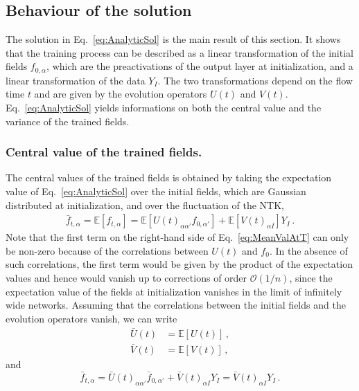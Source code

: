 \subsection{Behaviour of the solution}
\label{sec:BehaviourOfSolution}
The solution in Eq.~\eqref{eq:AnalyticSol} is the main result of this section. It shows that the
training process can be described as a linear transformation of the initial fields $f_{0,\alpha}$,
which are the preactivations of the output layer at initialization, and a linear transformation
of the data $Y_I$. The two transformations depend on the flow time $t$ and are given by the evolution
operators $U(t)$ and $V(t)$. Eq.~\eqref{eq:AnalyticSol} yields informations on both the central value
and the variance of the trained fields.

\subsubsection{Central value of the trained fields.}
\label{sec:CentralValue}
The central values of the trained fields is obtained by taking the expectation value of
Eq.~\eqref{eq:AnalyticSol} over the initial fields, which are Gaussian distributed at initialization, and over the
fluctuation of the NTK,
\begin{align}
    \label{eq:MeanValAtT}
    \bar{f}_{t,\alpha} = \mathbb{E}\left[f_{t,\alpha}\right]
        = \mathbb{E}\left[U(t)_{\alpha\alpha'} f_{0,\alpha'}\right]
            + \mathbb{E}\left[V(t)_{\alpha I}\right] Y_I \, .
\end{align}
Note that the first term on the right-hand side of Eq.~\eqref{eq:MeanValAtT} can only be non-zero because of the
correlations between $U(t)$ and $f_0$. In the absence of such correlations, the first term would be given by the product
of the expectation values and hence would vanish up to corrections of order $\mathcal{O}(1/n)$, since the expectation
value of the fields at initialization vanishes in the limit of infinitely wide networks.
Assuming that the correlations between the initial fields and the evolution operators vanish, we can write
\begin{align}
    \label{eq:MeanUt}
    \bar{U}(t)
        &= \mathbb{E}\left[U(t)\right]\, , \\
    \label{eq:MeanVt}
    \bar{V}(t)
        &= \mathbb{E}\left[V(t)\right]\, ,
\end{align}
and
\begin{equation}
    \label{eq:MeanValAtTNoCorr}
    \bar{f}_{t,\alpha} = \bar{U}(t)_{\alpha\alpha'} \bar{f}_{0,\alpha'}
        + \bar{V}(t)_{\alpha I} Y_I = \bar{V}(t)_{\alpha I} Y_I \, .
\end{equation}

